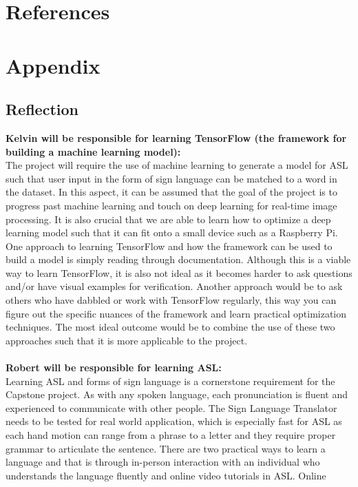 \documentclass[12pt]{article}
\begin{document}
\newpage
\section{References}

\newpage
\section{Appendix}
\subsection{Reflection}

\textbf{Kelvin will be responsible for learning TensorFlow (the framework for building a machine learning model):}\\
The project will require the use of machine learning to generate a model for ASL such that user input in the form of sign language
can be matched to a word in the dataset. In this aspect, it can be assumed that the goal of the project is to progress past machine
learning and touch on deep learning for real-time image processing. It is also crucial that we are able to learn how to optimize a deep
learning model such that it can fit onto a small device such as a Raspberry Pi. One approach to learning TensorFlow and how the framework
can be used to build a model is simply reading through documentation. Although this is a viable way to learn TensorFlow, it is also not
ideal as it becomes harder to ask questions and/or have visual examples for verification. Another approach would be to ask others who
have dabbled or work with TensorFlow regularly, this way you can figure out the specific nuances of the framework and learn practical
optimization techniques. The most ideal outcome would be to combine the use of these two approaches such that it is more applicable to the project.\\
~\\
\textbf{Robert will be responsible for learning ASL:}\\
Learning ASL and forms of sign language is a cornerstone requirement for the Capstone project. As with any spoken language, each pronunciation is fluent and 
experienced to communicate with other people. The Sign Language Translator needs to be tested for real world application, which is especially fast for ASL 
as each hand motion can range from a phrase to a letter and they require proper grammar to articulate the sentence. There are two practical ways to learn 
a language and that is through in-person interaction with an individual who understands the language fluently and online video tutorials in ASL. Online 
\end{document}
